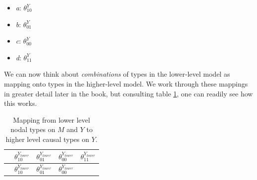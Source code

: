 \documentclass[12pt,]{book}
\providecommand{\tightlist}{%
  \setlength{\itemsep}{0pt}\setlength{\parskip}{0pt}}
\begin{document}
\begin{itemize}
\tightlist
\item
  \emph{a}: \(\theta_{10}^Y\)
\item
  \emph{b}: \(\theta_{01}^Y\)
\item
  \emph{c}: \(\theta_{00}^Y\)
\item
  \emph{d}: \(\theta_{11}^Y\)
\end{itemize}

We can now think about \emph{combinations} of types in the lower-level model as mapping onto types in the higher-level model. We work through these mappings in greater detail later in the book, but consulting table \ref{tab:highlowmapping}, one can readily see how this works.

\begin{longtable}[]{@{}lllll@{}}
\caption{\label{tab:highlowmapping} Mapping from lower level nodal types on \(M\) and \(Y\) to higher level causal types on \(Y\).}\tabularnewline
\toprule
\begin{minipage}[b]{0.13\columnwidth}\raggedright
\strut
\end{minipage} & \begin{minipage}[b]{0.18\columnwidth}\raggedright
\(\theta_{10}^{Y_{lower}}\)\strut
\end{minipage} & \begin{minipage}[b]{0.18\columnwidth}\raggedright
\(\theta_{01}^{Y_{lower}}\)\strut
\end{minipage} & \begin{minipage}[b]{0.18\columnwidth}\raggedright
\(\theta_{00}^{Y_{lower}}\)\strut
\end{minipage} & \begin{minipage}[b]{0.18\columnwidth}\raggedright
\(\theta_{11}^{Y_{lower}}\)\strut
\end{minipage}\tabularnewline
\midrule
\endfirsthead
\toprule
\begin{minipage}[b]{0.13\columnwidth}\raggedright
\strut
\end{minipage} & \begin{minipage}[b]{0.18\columnwidth}\raggedright
\(\theta_{10}^{Y_{lower}}\)\strut
\end{minipage} & \begin{minipage}[b]{0.18\columnwidth}\raggedright
\(\theta_{01}^{Y_{lower}}\)\strut
\end{minipage} & \begin{minipage}[b]{0.18\columnwidth}\raggedright
\(\theta_{00}^{Y_{lower}}\)\strut
\end{minipage} & \begin{minipage}[b]{0.18\columnwidth}\raggedright

\end{minipage}
\end{longtable}
\end{document}
